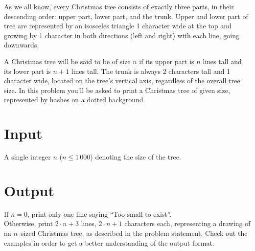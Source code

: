 \documentclass{spiral}
\begin{document}
  \makeheader

  As we all know, every Christmas tree consists of exactly three parts,
  in their descending order: upper part, lower part, and the trunk.
  Upper and lower part of tree are represented by an isosceles triangle 1 character wide
  at the top and growing by 1 character in both directions (left and right) 
  with each line, going downwards.
  
  A Christmas tree will be said to be of size $n$ if its upper part
  is $n$ lines tall and its lower part is $n + 1$ lines tall. 
  The trunk is always 2 characters tall and 1 character wide, located on
  the tree's vertical axis, regardless of the overall tree size.
  In this problem you'll be asked to print a Christmas tree of given size,
  represented by hashes on a dotted background.

  \section{Input}

    A single integer $n$ ($n \leq 1\,000$) denoting the size of the tree.

  \section{Output}

    If $n=0$, print only one line saying ``Too small to exist''.\\
    Otherwise, print $2 \cdot n + 3$ lines, $2 \cdot n + 1$ characters each, representing a drawing 
    of an $n$–sized Christmas tree, as described in the problem statement.
    Check out the examples in order to get a better understanding of the output format.

\end{document}
